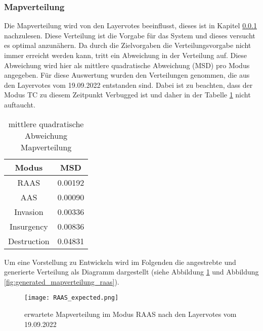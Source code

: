         \subsubsection{Mapverteilung}
            Die Mapverteilung wird von den Layervotes beeinflusst, dieses ist in Kapitel \ref{}  nachzulesen.
            Diese Verteilung ist die Vorgabe für das System und dieses versucht es optimal anzunähern. Da durch die 
            Zielvorgaben die Verteilungsvorgabe nicht immer erreicht werden kann, tritt ein Abweichung in der Verteilung auf.
            Diese Abweichung wird hier als mittlere quadratische Abweichung (MSD)  pro Modus angegeben.
            Für diese Auswertung wurden den Verteilungen genommen, die aus den Layervotes vom 19.09.2022 entstanden sind.
            Dabei ist zu beachten, dass der Modus TC zu diesem Zeitpunkt \glqq{}Verbugged\grqq{} ist und daher 
            in der Tabelle \ref{t:Ergebnisse:fehler_Mapverteilung} nicht auftaucht.\\
            \begin{table}[h]
                \centering
                \begin{tabular}{|| c c ||}
                    \hline
                    Modus & MSD \\
                    \hline
                    \hline
                    RAAS & 0.00192 \\
                    \hline
                    AAS & 0.00090 \\
                    \hline
                    Invasion & 0.00336 \\
                    \hline
                    Insurgency & 0.00836 \\
                    \hline
                    Destruction & 0.04831 \\
                    \hline
                \end{tabular}
                \caption{mittlere quadratische Abweichung Mapverteilung}
                \label{t:Ergebnisse:fehler_Mapverteilung}
            \end{table}
            
            Um eine Vorstellung zu Entwickeln wird im Folgenden die angestrebte und generierte Verteilung als 
            Diagramm dargestellt (siehe Abbildung \ref{fig:expected_mapverteilung_raas} 
            und Abbildung \ref{fig:generated_mapverteilung_raas}).

            \begin{figure}[htbp]
                \centering
                \texttt{[image: RAAS\_expected.png]}
                \caption{erwartete Mapverteilung im Modus RAAS nach den Layervotes vom 19.09.2022}
                \label{fig:expected_mapverteilung_raas}
            \end{figure}

